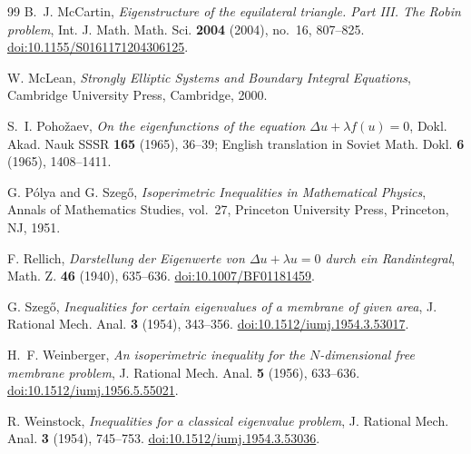 \documentclass[11pt,reqno]{amsart}
\numberwithin{equation}{section}
\theoremstyle{remark}
\begin{document}
\begin{thebibliography}{99}
B.~J. McCartin,
\emph{Eigenstructure of the equilateral triangle. Part III. The Robin problem},
Int. J. Math. Math. Sci. \textbf{2004} (2004), no.~16, 807--825.
\href{https://doi.org/10.1155/S0161171204306125}{doi:10.1155/S0161171204306125}.

W. McLean,
\emph{Strongly Elliptic Systems and Boundary Integral Equations},
Cambridge University Press, Cambridge, 2000.

S.~I. Poho\v{z}aev,
\emph{On the eigenfunctions of the equation $\Delta u+\lambda f(u)=0$},
Dokl. Akad. Nauk SSSR \textbf{165} (1965), 36--39;
English translation in Soviet Math. Dokl. \textbf{6} (1965), 1408--1411.

G. P\'olya and G. Szeg\H{o},
\emph{Isoperimetric Inequalities in Mathematical Physics},
Annals of Mathematics Studies, vol.~27,
Princeton University Press, Princeton, NJ, 1951.

F. Rellich,
\emph{Darstellung der Eigenwerte von $\Delta u+\lambda u=0$
durch ein Randintegral},
Math. Z. \textbf{46} (1940), 635--636.
\href{https://doi.org/10.1007/BF01181459}{doi:10.1007/BF01181459}.

G. Szeg\H{o},
\emph{Inequalities for certain eigenvalues of a membrane of given area},
J. Rational Mech. Anal. \textbf{3} (1954), 343--356.
\href{https://doi.org/10.1512/iumj.1954.3.53017}{doi:10.1512/iumj.1954.3.53017}.

H.~F. Weinberger,
\emph{An isoperimetric inequality for the $N$-dimensional free membrane problem},
J. Rational Mech. Anal. \textbf{5} (1956), 633--636.
\href{https://doi.org/10.1512/iumj.1956.5.55021}{doi:10.1512/iumj.1956.5.55021}.

R. Weinstock,
\emph{Inequalities for a classical eigenvalue problem},
J. Rational Mech. Anal. \textbf{3} (1954), 745--753.
\href{https://doi.org/10.1512/iumj.1954.3.53036}{doi:10.1512/iumj.1954.3.53036}.
\end{thebibliography}
\end{document}

